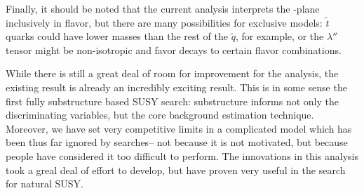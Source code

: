 
Finally, it should be noted that the current analysis interprets the \gluino-\lsp plane inclusively in flavor, but there are many possibilities for exclusive models: $\tilde{t}$ quarks could have lower masses than the rest of the $\tilde{q}$, for example, or the $\lambda''$ tensor might be non-isotropic and favor decays to certain flavor combinations.

While there is still a great deal of room for improvement for the analysis, the existing result is already an incredibly exciting result. This is in some sense the first fully substructure based SUSY search: substructure informs not only the discriminating variables, but the core background estimation technique. Moreover, we have set very competitive limits in a complicated model which has been thus far ignored by searches-- not because it is not motivated, but because people have considered it too difficult to perform. The innovations in this analysis took a greal deal of effort to develop, but have proven very useful in the search for natural SUSY.




